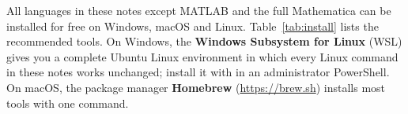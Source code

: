 \setcounter{table}{0}

All languages in these notes except MATLAB and the full Mathematica can be installed for
free on Windows, macOS and Linux. Table~\ref{tab:install} lists the recommended tools. On
Windows, the \textbf{Windows Subsystem for Linux} (WSL) gives you a complete Ubuntu Linux
environment in which every Linux command in these notes works unchanged; install it with
 in an administrator PowerShell. On macOS, the package manager
\textbf{Homebrew} (\url{https://brew.sh}) installs most tools with one command.


